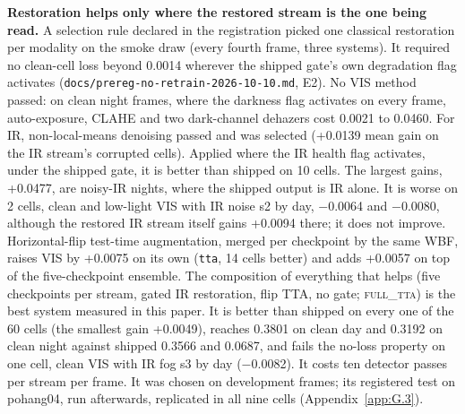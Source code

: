 \documentclass[10pt]{article}
\begin{document}
\textbf{Restoration helps only where the restored stream is the one being read.} A selection rule declared in the registration picked one classical restoration per modality on the smoke draw (every fourth frame, three systems). It required no clean-cell loss beyond 0.0014 wherever the shipped gate's own degradation flag activates (\texttt{docs/\allowbreak{}prereg-no-retrain-2026-10-10.md}, E2). No VIS method passed: on clean night frames, where the darkness flag activates on every frame, auto-exposure, CLAHE and two dark-channel dehazers cost 0.0021 to 0.0460. For IR, non-local-means denoising passed and was selected (+0.0139 mean gain on the IR stream's corrupted cells). Applied where the IR health flag activates, under the shipped gate, it is better than shipped on 10 cells. The largest gains, +0.0477, are noisy-IR nights, where the shipped output is IR alone. It is worse on 2 cells, clean and low-light VIS with IR noise s2 by day, $-$0.0064 and $-$0.0080, although the restored IR stream itself gains +0.0094 there; it does not improve. Horizontal-flip test-time augmentation, merged per checkpoint by the same WBF, raises VIS by +0.0075 on its own (\texttt{tta}, 14 cells better) and adds +0.0057 on top of the five-checkpoint ensemble. The composition of everything that helps (five checkpoints per stream, gated IR restoration, flip TTA, no gate; \textsc{full\_tta}) is the best system measured in this paper. It is better than shipped on every one of the 60 cells (the smallest gain +0.0049), reaches 0.3801 on clean day and 0.3192 on clean night against shipped 0.3566 and 0.0687, and fails the no-loss property on one cell, clean VIS with IR fog s3 by day ($-$0.0082). It costs ten detector passes per stream per frame. It was chosen on development frames; its registered test on pohang04, run afterwards, replicated in all nine cells (Appendix~\ref{app:G.3}).
\end{document}
